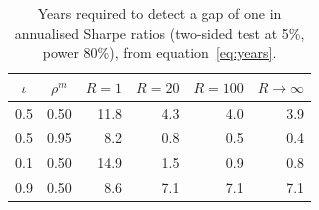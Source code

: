 \begin{table}[ht]
\centering
\small
\caption{Years required to detect a gap of one in annualised Sharpe ratios (two-sided test at 5\%, power 80\%), from equation~\eqref{eq:years}.}
\label{tab:years}
\begin{tabular}{ccrrrr}
\toprule
$\iota$ & $\rho^m$ & $R=1$ & $R=20$ & $R=100$ & $R\to\infty$ \\
\midrule
0.5 & 0.50 & 11.8 & 4.3 & 4.0 & 3.9 \\
0.5 & 0.95 & 8.2 & 0.8 & 0.5 & 0.4 \\
0.1 & 0.50 & 14.9 & 1.5 & 0.9 & 0.8 \\
0.9 & 0.50 & 8.6 & 7.1 & 7.1 & 7.1 \\
\bottomrule
\end{tabular}
\end{table}
